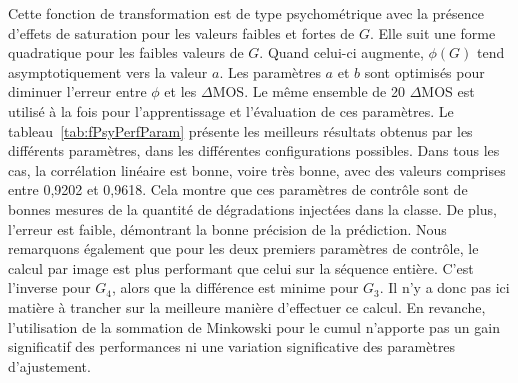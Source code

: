 Cette fonction de transformation est de type psychométrique avec la présence d'effets de saturation pour les valeurs faibles et fortes de $G$. Elle suit une forme quadratique pour les faibles valeurs de $G$. Quand celui-ci augmente, $\phi(G)$ tend asymptotiquement vers la valeur $a$. Les paramètres $a$ et $b$ sont optimisés pour diminuer l'erreur entre $\phi$ et les $\Delta$MOS. Le même ensemble de 20 $\Delta$MOS est utilisé à la fois pour l'apprentissage et l'évaluation de ces paramètres. Le tableau~\ref{tab:fPsyPerfParam} présente les meilleurs résultats obtenus par les différents paramètres, dans les différentes configurations possibles. Dans tous les cas, la corrélation linéaire est bonne, voire très bonne, avec des valeurs comprises entre 0,9202 et 0,9618. Cela montre que ces paramètres de contrôle sont de bonnes mesures de la quantité de dégradations injectées dans la classe. De plus, l'erreur est faible, démontrant la bonne précision de la prédiction. Nous remarquons également que pour les deux premiers paramètres de contrôle, le calcul par image est plus performant que celui sur la séquence entière. C'est l'inverse pour $G_4$, alors que la différence est minime pour $G_3$. Il n'y a donc pas ici matière à trancher sur la meilleure manière d'effectuer ce calcul. En revanche, l'utilisation de la sommation de Minkowski pour le cumul n'apporte pas un gain significatif des performances ni une variation significative des paramètres d'ajustement.

